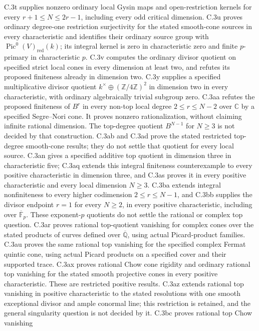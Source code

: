 C.3t supplies nonzero ordinary local Gysin maps and
open-restriction kernels for every $r+1\le N\le2r-1$,
including every odd critical dimension.
C.3u proves ordinary degree-one restriction surjectivity for
the stated smooth-cone sources in every characteristic and
identifies their ordinary source group with
$\operatorname{Pic}^0(V)_{\mathrm{red}}(k)$; its integral kernel
is zero in characteristic zero and finite $p$-primary in
characteristic $p$.
C.3v computes the ordinary divisor quotient on specified
strict local cones in every dimension at least two,
and refutes its proposed finiteness already in dimension two.
C.3y supplies a specified multiplicative divisor quotient
$k^\times\oplus(\mathbb Z/4\mathbb Z)^2$ in dimension two
in every characteristic, with ordinary algebraically
trivial subgroup zero.
C.3aa refutes the proposed finiteness of $B^r$ in every
non-top local degree $2\le r\le N-2$ over $\mathbb C$ by a
specified Segre--Nori cone. It proves nonzero rationalization,
without claiming infinite rational dimension. The top-degree
quotient $B^{N-1}$ for $N\ge3$ is not decided by that construction.
C.3ab and C.3ad prove the stated restricted top-degree
smooth-cone results; they do not settle that quotient for
every local source. C.3an gives a specified additive
top quotient in dimension three in characteristic five;
C.3aq extends this integral finiteness counterexample
to every positive characteristic in dimension three, and C.3as
proves it in every positive characteristic and every local
dimension $N\ge3$. C.3ba extends integral nonfiniteness to every
higher codimension $2\le r\le N-1$, and C.3bb supplies the
divisor endpoint $r=1$ for every $N\ge2$, in every positive
characteristic, including over $\overline{\mathbb F}_p$. These exponent-$p$
quotients do not settle the rational or complex top question. C.3ar proves rational
top-quotient vanishing for complex cones over the stated
products of curves defined over $\overline{\mathbb Q}$, using
actual Picard-product families. C.3au proves the same rational
top vanishing for the specified complex Fermat quintic cone,
using actual Picard products on a specified cover and their
supported trace. C.3ax proves rational Chow cone rigidity and
ordinary rational top vanishing for the stated smooth projective
cones in every positive characteristic. These are restricted
positive results. C.3az extends rational top vanishing in
positive characteristic to the stated resolutions with one
smooth exceptional divisor and ample conormal line; this
restriction is retained, and the general singularity question
is not decided by it. C.3bc proves rational top Chow vanishing
